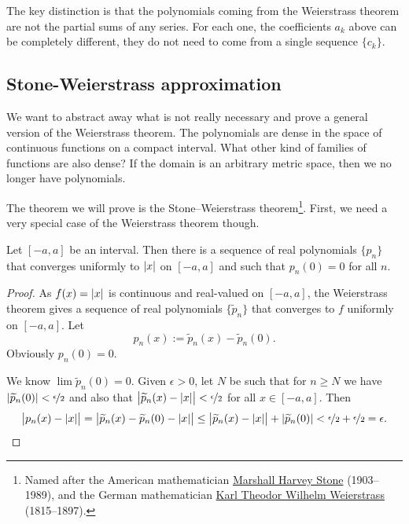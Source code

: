 The key distinction is that
the polynomials coming from the Weierstrass theorem are not the partial
sums of any series.  For each one, the coefficients $a_k$ above can be
completely different, they do not need to come from a single sequence $\{
c_k \}$.

\subsection{Stone-Weierstrass approximation}

We want to abstract away what is not really
necessary and prove a general version of the Weierstrass theorem.
The polynomials are dense in the space of continuous
functions on a compact interval.  What other kind of families of
functions are also dense?  If the domain is an
arbitrary metric space, then we no longer have polynomials.

The theorem we will prove is the Stone--Weierstrass theorem\footnote{%
Named after the American mathematician
\href{http://en.wikipedia.org/wiki/Marshall_Harvey_Stone}{Marshall Harvey Stone}
(1903--1989), and the German mathematician
\href{http://en.wikipedia.org/wiki/Karl_Weierstrass}{Karl Theodor Wilhelm Weierstrass}
(1815--1897).}.
First,
we need a very
special case of the Weierstrass theorem though.

\begin{cor}
Let $[-a,a]$ be an interval.  Then there is a sequence of real polynomials
$\{ p_n \}$ that converges uniformly to $\lvert {x} \rvert$ on $[-a,a]$ and such that
$p_n(0) = 0$ for all $n$.
\end{cor}

\begin{proof}
As $f(x) = \lvert {x} \rvert$ is continuous and real-valued
on $[-a,a]$, the Weierstrass theorem gives a sequence of
real polynomials $\{ \widetilde{p}_n \}$ that converges to $f$
uniformly on $[-a,a]$.
Let
\begin{equation*}
p_n(x) := \widetilde{p}_n(x) - \widetilde{p}_n(0) .
\end{equation*}
Obviously $p_n(0) = 0$.

We know
$\lim \widetilde{p}_n(0) = 0$.  Given $\epsilon > 0$, let $N$ be such that
for $n \geq N$ we have $\lvert {\widetilde{p}_n(0)} \rvert < \nicefrac{\epsilon}{2}$
and also that $\bigl\lvert\widetilde{p}_n(x)-\lvert {x} \rvert\big\rvert <
\nicefrac{\epsilon}{2}$ for all $x \in [-a,a]$.
Then
\begin{equation*}
\bigl\lvert p_n(x)-\lvert {x} \rvert \bigr\rvert
=
\bigl\lvert \widetilde{p}_n(x) - \widetilde{p}_n(0) - \lvert {x} \rvert \bigr\rvert
\leq
\bigl\lvert \widetilde{p}_n(x) - \lvert {x} \rvert \bigr\rvert + \lvert {\widetilde{p}_n(0)} \rvert < 
\nicefrac{\epsilon}{2} + \nicefrac{\epsilon}{2} = \epsilon . \qedhere
\end{equation*}
\end{proof}

